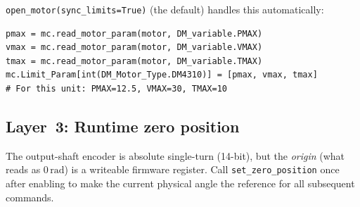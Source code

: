 \documentclass[11pt,a4paper]{article}
\begin{document}
\noindent\texttt{open\_motor(sync\_limits=True)} (the default) handles this
automatically:
\begin{lstlisting}
pmax = mc.read_motor_param(motor, DM_variable.PMAX)
vmax = mc.read_motor_param(motor, DM_variable.VMAX)
tmax = mc.read_motor_param(motor, DM_variable.TMAX)
mc.Limit_Param[int(DM_Motor_Type.DM4310)] = [pmax, vmax, tmax]
# For this unit: PMAX=12.5, VMAX=30, TMAX=10
\end{lstlisting}

\subsection{Layer~3: Runtime zero position}

The output-shaft encoder is absolute single-turn (14-bit), but the
\emph{origin} (what reads as $0\,\mathrm{rad}$) is a writeable firmware
register.  Call \texttt{set\_zero\_position} once after enabling to make
the current physical angle the reference for all subsequent commands.
\end{document}
